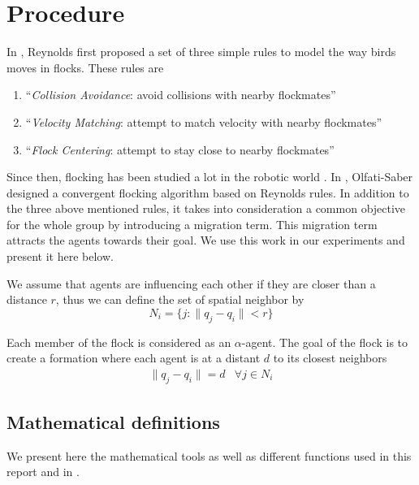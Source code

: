 \section{Procedure}

In \cite{reynolds_flocks_1987}, Reynolds first proposed a set of three simple rules to model the way birds moves in flocks. These rules are
\begin{enumerate}
 \item ``\emph{Collision Avoidance}: avoid collisions with nearby flockmates''
 \item ``\emph{Velocity Matching}: attempt to match velocity with nearby flockmates''
 \item ``\emph{Flock Centering}: attempt to stay close to nearby flockmates''
\end{enumerate}

Since then, flocking has been studied a lot in the robotic world \cite{hauert_reynolds_2011, lindhe_flocking_2005, viragh_flocking_2013}. In \cite{olfati-saber_flocking_2006}, Olfati-Saber designed a convergent flocking algorithm based on Reynolds rules. In addition to the three above mentioned rules, it takes into consideration a common objective for the whole group by introducing a migration term. This migration term attracts the agents towards their goal. We use this work in our experiments and present it here below.  

We assume that agents are influencing each other if they are closer than a distance $r$, thus we can define the set of spatial neighbor by
\begin{equation}
N_i=\{j:\|q_j-q_i\|<r\}
\label{eq:Ni}
\end{equation}

Each member of the flock is considered as an $\alpha$-agent. The goal of the flock is to create a formation where each agent is at a distant $d$ to its closest neighbors
\begin{equation}
\begin{array}{ll}
\|q_j-q_i\|=d & \forall j \in N_i
\end{array}
\label{eq:lattice}
\end{equation}

\subsection{Mathematical definitions}

We present here the mathematical tools as well as different functions used in this report and in \cite{olfati-saber_flocking_2006}. 

